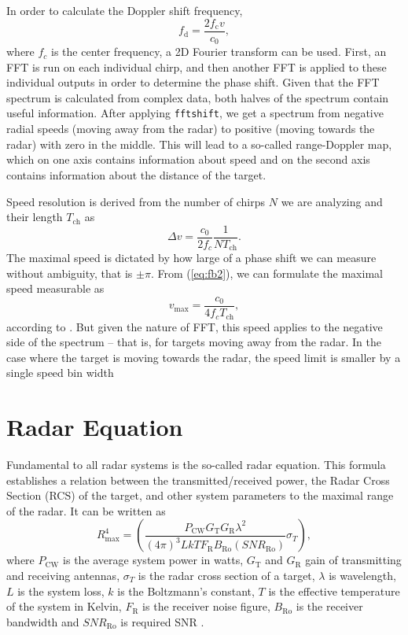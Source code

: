 In order to calculate the Doppler shift frequency,
\begin{equation}
  f_\mathrm{d} = \frac{2f_\mathrm{c}v}{c_0},
  \label{eq:Doppler2}
\end{equation}
where $f_c$ is the center frequency, a 2D Fourier transform can be used.
First, an FFT is run on each individual chirp, and then another FFT is applied to these individual outputs in order to determine the phase shift.
Given that the FFT spectrum is calculated from complex data, both halves of the spectrum contain useful information.
After applying \verb|fftshift|, we get a spectrum from negative radial speeds (moving away from the radar) to positive (moving towards the radar) with zero in the middle.
This will lead to a so-called range-Doppler map, which on one axis contains information about speed and on the second axis contains information about the distance of the target.

Speed resolution is derived from the number of chirps $N$ we are analyzing and their length $T_{\mathrm{ch}}$ as \cite{suleymanov2016}
\begin{equation}
  \Delta v = \frac{c_0}{2f_c} \frac{1}{NT_{\mathrm{ch}}}.
  \label{eq:Doppler3}
\end{equation}
The maximal speed is dictated by how large of a phase shift we can measure without ambiguity, that is $\pm \pi$.
From (\ref{eq:fb2}), we can formulate the maximal speed measurable as
\[
  v_\mathrm{max} = \frac{c_0}{4f_c T_\mathrm{ch}},
\]
according to \cite{fmcwSpeed}.
But given the nature of FFT, this speed applies to the negative side of the spectrum -- that is, for targets moving away from the radar.
In the case where the target is moving towards the radar, the speed limit is smaller by a single speed bin width

\section{Radar Equation}

Fundamental to all radar systems is the so-called radar equation.
This formula establishes a relation between the transmitted/received power, the Radar Cross Section (RCS) of the target, and other system parameters to the maximal range of the radar.
It can be written as
\begin{equation}
	R_\mathrm{max}^4 = \left(\frac{P_{\mathrm{CW}}G_\mathrm{T}G_\mathrm{R}\lambda^2}{(4\pi)^3 L k T F_\mathrm{R}B_\mathrm{Ro}(SNR_\mathrm{Ro})} \sigma_T\right),
	\label{eq:radar_eq}
\end{equation}
where $P_\mathrm{CW}$ is the average system power in watts, $G_\mathrm{T}$ and $G_\mathrm{R}$ gain of transmitting and receiving antennas, $\sigma_T$ is the radar cross section of a target, $\lambda$ is wavelength, $L$ is the system loss, $k$ is the Boltzmann's constant, $T$ is the effective temperature of the system in Kelvin, $F_\mathrm{R}$ is the receiver noise figure, $B_\mathrm{Ro}$ is the receiver bandwidth and $SNR_\mathrm{Ro}$ is required SNR \cite{jankiraman2018}.


